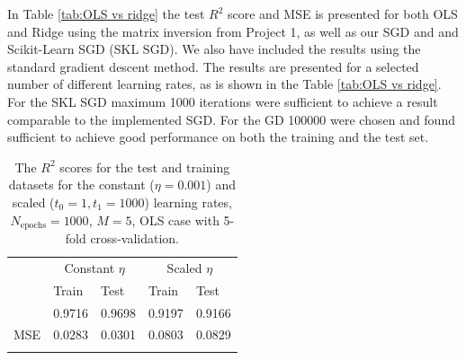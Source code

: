 \documentclass{emulateapj}
\begin{document}
In Table \ref{tab:OLS vs ridge} the test $R^{2}$ score and MSE is presented for both OLS and Ridge using the matrix inversion from Project 1, as well as our SGD and and Scikit-Learn SGD (SKL SGD). We also have included the results using the standard gradient descent method. The results are presented for a selected number of different learning rates, as is shown in the Table \ref{tab:OLS vs ridge}. For the SKL SGD maximum 1000 iterations were sufficient to achieve a result comparable to the implemented SGD. For the GD 100000 were chosen and found sufficient to achieve good performance on both the training and the test set.


\begin{table}[!htb]
\begin{center}
\caption{The $R^2$ scores for the test and training datasets for the constant ($\eta=0.001$) and scaled ($t_0=1, t_1=1000$) learning rates, $N_{\mathrm{epochs}}=1000$, $M=5$, OLS case with 5-fold cross-validation.}
\label{tab:OLS}  
\begin{tabular}{lllll}
\cline{2-5}
\noalign{\smallskip}
\cline{2-5}\noalign{\smallskip}
& \multicolumn{2}{c}{Constant $\eta$} & \multicolumn{2}{c}{Scaled $\eta$}\\
\cline{2-5}\noalign{\smallskip} & Train &  Test  & Train & Test \\
\hline\noalign{\smallskip}
\multicolumn{1}{l|}{$R^2$} & 0.9716 & 0.9698 & 0.9197 & 0.9166 \\
\multicolumn{1}{l|}{MSE} & 0.0283 & 0.0301 & 0.0803 & 0.0829 \\ \noalign{\smallskip}\hline
\end{tabular}
\end{center}
\end{table}
\end{document}
